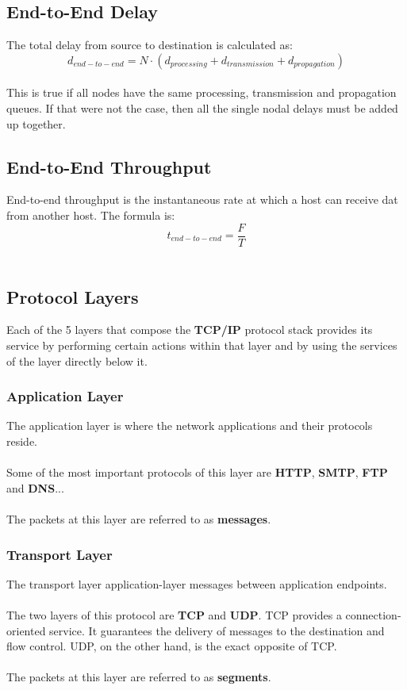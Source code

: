 \documentclass{article}
\begin{document}
\subsection{End-to-End Delay}
The total delay from source to destination is calculated as: \\

	\[ d_{end-to-end} = N \cdot (d_{processing} + d_{transmission} + d_{propagation}) \] \\
	
\noindent This is true if all nodes have the same processing, transmission and propagation queues. If that were not the case, then all the single nodal delays must be added up together.

\subsection{End-to-End Throughput}
End-to-end throughput is the instantaneous rate at which a host can receive dat from another host. The formula is: \\

	\[ t_{end-to-end} = \frac{F}{T} \] \
	
\subsection{Protocol Layers}
Each of the 5 layers that compose the \textbf{TCP/IP} protocol stack provides its service by performing certain actions within that layer and by using the services of the layer directly below it.

\subsubsection{Application Layer}
The application layer is where the network applications and their protocols reside. \\ \\
Some of the most important protocols of this layer are \textbf{HTTP}, \textbf{SMTP}, \textbf{FTP} and \textbf{DNS}... \\ \\
The packets at this layer are referred to as \textbf{messages}.

\subsubsection{Transport Layer}
The transport layer application-layer messages between application endpoints. \\ \\
The two layers of this protocol are \textbf{TCP} and \textbf{UDP}. TCP provides a connection-oriented service. It guarantees the delivery of messages to the destination and flow control. UDP, on the other hand, is the exact opposite of TCP. \\ \\
The packets at this layer are referred to as \textbf{segments}.
\end{document}
